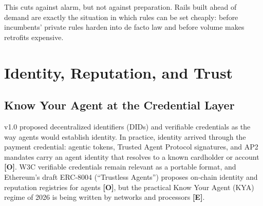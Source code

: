 \documentclass[11pt,letterpaper]{article}
\begin{document}
This cuts against alarm, but not against preparation. Rails built ahead of demand are exactly the situation in which rules can be set cheaply: before incumbents' private rules harden into de facto law and before volume makes retrofits expensive.

\section{Identity, Reputation, and Trust}

\subsection{Know Your Agent at the Credential Layer}

v1.0 proposed decentralized identifiers (DIDs) and verifiable credentials as the way agents would establish identity. In practice, identity arrived through the payment credential: agentic tokens, Trusted Agent Protocol signatures, and AP2 mandates carry an agent identity that resolves to a known cardholder or account \textbf{[O]}. W3C verifiable credentials remain relevant as a portable format, and Ethereum's draft ERC-8004 (``Trustless Agents'') proposes on-chain identity and reputation registries for agents \textbf{[O]}, but the practical Know Your Agent (KYA) regime of 2026 is being written by networks and processors \textbf{[E]}.
\end{document}
